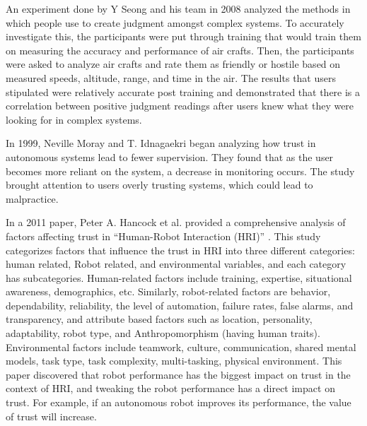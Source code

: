 \documentclass[runningheads,a4paper]{llncs}
\begin{document}
An experiment done by Y Seong and his team in 2008 analyzed the methods in which people use to create judgment amongst complex systems\cite{seong2008impact}.  To accurately investigate this, the participants were put through training that would train them on measuring the accuracy and performance of air crafts.  Then, the participants were asked to analyze air crafts and rate them as friendly or hostile based on measured speeds, altitude, range, and time in the air.  The results that users stipulated were relatively accurate post training and demonstrated that there is a correlation between positive judgment readings after users knew what they were looking for in complex systems.

In 1999, Neville Moray and T. Idnagaekri began analyzing how trust in autonomous systems lead to fewer supervision\cite{moray1999laboratory}.  They found that as the user becomes more reliant on the system, a decrease in monitoring occurs. The study brought attention to users overly trusting systems, which could lead to malpractice. 

In a 2011 paper, Peter A. Hancock et al. provided a comprehensive analysis of factors affecting trust in ``Human-Robot Interaction (HRI)'' \cite{hancock2011meta}. This study categorizes factors that influence the trust in HRI into three different categories: human related, Robot related, and environmental variables, and each category has subcategories. Human-related factors include training, expertise, situational awareness, demographics, etc. Similarly, robot-related factors are behavior, dependability, reliability, the level of automation, failure rates, false alarms, and transparency, and attribute based factors such as location, personality, adaptability, robot type, and Anthropomorphism (having human traits). Environmental factors include teamwork, culture, communication, shared mental models, task type, task complexity, multi-tasking, physical environment. This paper discovered that robot performance has the biggest impact on trust in the context of HRI, and tweaking the robot performance has a direct impact on trust. For example, if an autonomous robot improves its performance, the value of trust will increase.
\end{document}
